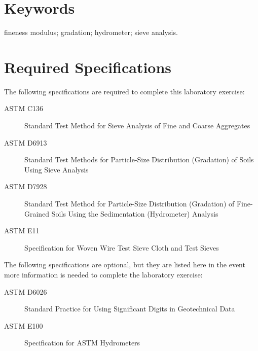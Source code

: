 \documentclass[12pt]{article}
\begin{document}
\vfill
\section*{Keywords}
\normalsize fineness modulus; gradation; hydrometer; sieve analysis.\\
\pagebreak
\begin{center}
\tableofcontents
\pagebreak
\listoftables
\listoffigures
\end{center}
\pagebreak
\section*{Required Specifications}
The following specifications are required to complete this laboratory exercise:
\begin{description}
\item[ASTM C136] Standard Test Method for Sieve Analysis of Fine and Coarse Aggregates
\item[ASTM D6913] Standard Test Methods for Particle-Size Distribution (Gradation) of Soils Using Sieve Analysis
\item[ASTM D7928] Standard Test Method for Particle-Size Distribution (Gradation) of Fine-Grained Soils Using the Sedimentation (Hydrometer) Analysis
\item[ASTM E11] Specification for Woven Wire Test Sieve Cloth and Test Sieves
\end{description}

The following specifications are optional, but they are listed here in the event more information is needed to complete the laboratory exercise:
\begin{description}
\item[ASTM D6026] Standard Practice for Using Significant Digits in Geotechnical Data
\item[ASTM E100] Specification for ASTM Hydrometers
\end{description}
\pagebreak
\end{document}
